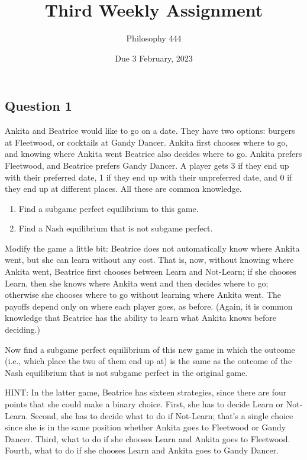 \documentclass[
  11pt,
]{article}
\title{Third Weekly Assignment}
\author{Philosophy 444}
\date{Due 3 February, 2023}
\providecommand{\tightlist}{%
  \setlength{\itemsep}{0pt}\setlength{\parskip}{0pt}}
\begin{document}
\maketitle

\hypertarget{question-1}{%
\subsection{Question 1}\label{question-1}}

Ankita and Beatrice would like to go on a date. They have two options:
burgers at Fleetwood, or cocktails at Gandy Dancer. Ankita first chooses
where to go, and knowing where Ankita went Beatrice also decides where
to go. Ankita prefers Fleetwood, and Beatrice prefers Gandy Dancer. A
player gets 3 if they end up with their preferred date, 1 if they end up
with their unpreferred date, and 0 if they end up at different places.
All these are common knowledge.

\begin{enumerate}
\def\labelenumi{\alph{enumi}.}
\tightlist
\item
  Find a subgame perfect equilibrium to this game.
\item
  Find a Nash equilibrium that is not subgame perfect.
\end{enumerate}

Modify the game a little bit: Beatrice does not automatically know where
Ankita went, but she can learn without any cost. That is, now, without
knowing where Ankita went, Beatrice first chooses between Learn and
Not-Learn; if she chooses Learn, then she knows where Ankita went and
then decides where to go; otherwise she chooses where to go without
learning where Ankita went. The payoffs depend only on where each player
goes, as before. (Again, it is common knowledge that Beatrice has the
ability to learn what Ankita knows before deciding.)

Now find a subgame perfect equilibrium of this new game in which the
outcome (i.e., which place the two of them end up at) is the same as the
outcome of the Nash equilibrium that is not subgame perfect in the
original game.

HINT: In the latter game, Beatrice has sixteen strategies, since there
are four points that she could make a binary choice. First, she has to
decide Learn or Not-Learn. Second, she has to decide what to do if
Not-Learn; that's a single choice since she is in the same position
whether Ankita goes to Fleetwood or Gandy Dancer. Third, what to do if
she chooses Learn and Ankita goes to Fleetwood. Fourth, what to do if
she chooses Learn and Ankita goes to Gandy Dancer.
\end{document}
